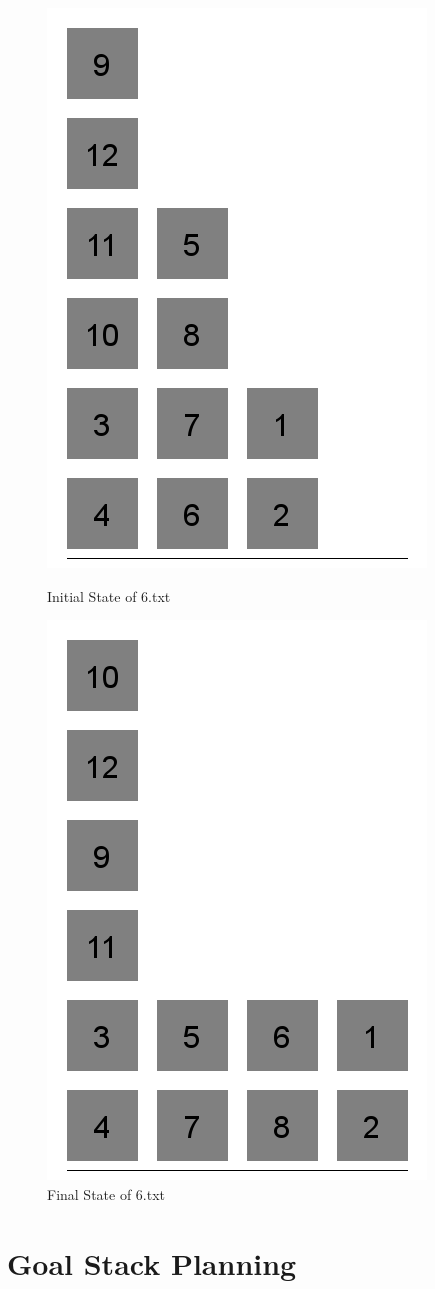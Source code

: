 \documentclass{article}
\begin{document}
\begin{itemize}
\begin{figure}[H]
    \centering
    \begin{minipage}{0.5\textwidth}
        \centering
        \includegraphics[scale=0.3]{6i}
        \caption{Initial State  of 6.txt}
    \end{minipage}\hfill
    \begin{minipage}{0.5\textwidth}
        \centering
        \includegraphics[scale=0.3]{6f}
        \caption{Final State  of 6.txt}
    \end{minipage}
\end{figure}
\end{itemize}

\section{Goal Stack Planning}
\end{document}
